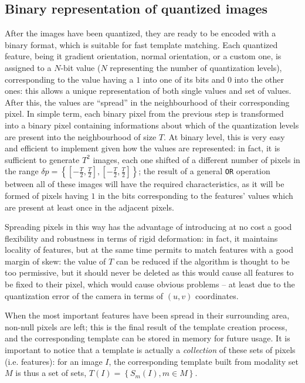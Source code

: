 \subsection{Binary representation of quantized images} \label{sec:linemod-binary}
After the images have been quantized, they are ready to be encoded
with a binary format, which is suitable for fast template
matching. Each quantized feature, being it gradient orientation,
normal orientation, or a custom one, is assigned to a $N$-bit value
($N$ representing the number of quantization levels), corresponding to
the value having a $1$ into one of its bits and $0$ into the other
ones: this allows a unique representation of both single values and
set of values. After this,
the values are ``spread'' in the neighbourhood of their corresponding
pixel. In simple term, each binary pixel from the previous step is
transformed into a binary pixel containing informations about which of
the quantization levels are present into the neighbourhood of size
$T$. At binary level, this is very easy and efficient to implement
given how the values are represented: in fact, it is sufficient to
generate $T^2$ images, each one shifted of a different number of
pixels in the range $\delta p = \left\{\left[-\frac{T}{2},
  \frac{T}{2}\right], \left[-\frac{T}{2},
  \frac{T}{2}\right]\right\}$; the result of a general \texttt{OR}
operation between all of these images will have the required
characteristics, as it will be formed of pixels having $1$ in the bits
corresponding to the features' values which are present at least once in
the adjacent pixels.

Spreading pixels in this way has the advantage of introducing at no
cost a good flexibility and robustness in terms of rigid deformation:
in fact, it maintains locality of features, but at the same time
permits to match features with a good margin of skew: the value of $T$
can be reduced if the algorithm is thought to be too permissive, but
it should never be deleted as this would cause all features to be
fixed to their pixel, which would cause obvious problems -- at least
due to the quantization error of the camera in terms of $(u,v)$
coordinates.

When the most important features have been spread in their surrounding
area, non-null pixels are left; this is the final result of the
template creation process, and the corresponding template can be
stored in memory for future usage. It is important to notice that a
template is actually a \emph{collection} of these sets of pixels
(i.e. features): for an image $I$, the corresponding template built
from modality set $M$ is thus a set of sets, $T(I) = \left\{ S_m(I), m \in M \right\}$.

